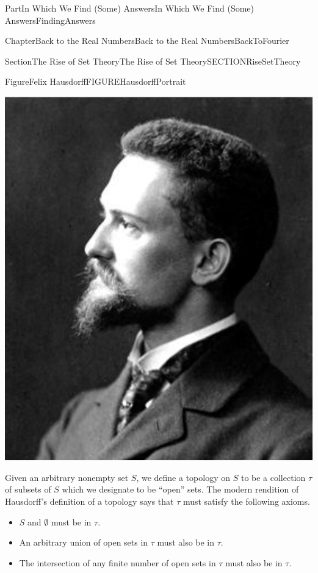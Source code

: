 \documentclass[oneside,10pt,]{book}
\numberwithin{equation}{part}
\begin{document}
\begin{partptx}{Part}{In Which We Find (Some) Answers}{}{In Which We Find (Some) Answers}{}{}{FindingAnswers}
\begin{chapterptx}{Chapter}{Back to the Real Numbers}{}{Back to the Real Numbers}{}{}{BackToFourier}
\begin{sectionptx}{Section}{The Rise of Set Theory}{}{The Rise of Set Theory}{}{}{SECTIONRiseSetTheory}
\begin{figureptx}{Figure}{Felix Hausdorff}{FIGUREHausdorffPortrait}{}%
\begin{image}{0.325}{0.35}{0.325}{}%
\includegraphics[width=\linewidth]{external/images/Hausdorff.png}
\end{image}%
\tcblower
\end{figureptx}%
Given an arbitrary nonempty set \(S\), we define a topology on \(S\) to be a collection \(\tau \) of subsets of \(S\) which we designate to be ``open'' sets.  The modern rendition of Hausdorff's definition of a topology says that \(\tau \) must satisfy the following axioms.%
\begin{itemize}[label=\textbullet]
\item{}\(S\) and \(\emptyset \) must be in \(\tau \).%
\item{}An arbitrary union of open sets in \(\tau \) must also be in \(\tau \).%
\item{}The intersection of any finite number of open sets in \(\tau \) must also be in \(\tau \).%
\end{itemize}
%
\par

\end{sectionptx}
\end{chapterptx}
\end{partptx}
\end{document}
